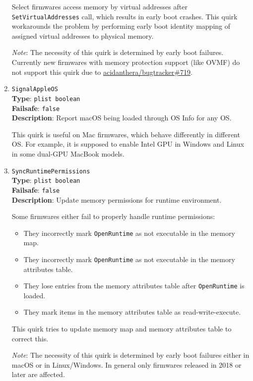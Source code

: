 \documentclass[]{article}
\providecommand{\tightlist}{%
  \setlength{\itemsep}{0pt}\setlength{\parskip}{0pt}}
\begin{document}
\begin{enumerate}
  Select firmwares access memory by virtual addresses after \texttt{SetVirtualAddresses}
  call, which results in early boot crashes. This quirk workarounds the problem by
  performing early boot identity mapping of assigned virtual addresses to physical
  memory.

  \emph{Note}: The necessity of this quirk is determined by early boot failures. Currently
  new firmwares with memory protection support (like OVMF) do not support this quirk due to
  \href{https://github.com/acidanthera/bugtracker/issues/719}{acidanthera/bugtracker\#719}.

\item
  \texttt{SignalAppleOS}\\
  \textbf{Type}: \texttt{plist\ boolean}\\
  \textbf{Failsafe}: \texttt{false}\\
  \textbf{Description}: Report macOS being loaded through OS Info for any OS.

  This quirk is useful on Mac firmwares, which behave differently in different OS.
  For example, it is supposed to enable Intel GPU in Windows and Linux in some
  dual-GPU MacBook models.

\item
  \texttt{SyncRuntimePermissions}\\
  \textbf{Type}: \texttt{plist\ boolean}\\
  \textbf{Failsafe}: \texttt{false}\\
  \textbf{Description}: Update memory permissions for runtime environment.

  Some firmwares either fail to properly handle runtime permissions:
  \begin{itemize}
    \tightlist
    \item They incorrectly mark \texttt{OpenRuntime} as not executable in the memory map.
    \item They incorrectly mark \texttt{OpenRuntime} as not executable in the memory
    attributes table.
    \item They lose entries from the memory attributes table after \texttt{OpenRuntime}
    is loaded.
    \item They mark items in the memory attributes table as read-write-execute.
  \end{itemize}

  This quirk tries to update memory map and memory attributes table to correct this.

  \emph{Note}: The necessity of this quirk is determined by early boot failures either in
  macOS or in Linux/Windows. In general only firmwares released in 2018 or later are affected.

\end{enumerate}
\end{document}
